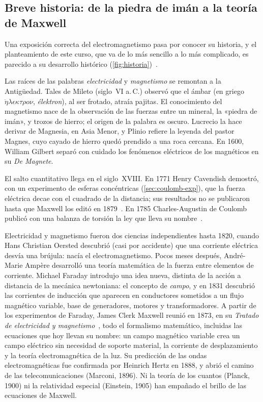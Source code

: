 \subsection{Breve historia: de la piedra de imán a la teoría de Maxwell}\label{sec:historia}
Una exposición correcta del electromagnetismo pasa por conocer su historia, y el
planteamiento de este curso, que va de lo más sencillo a lo más complicado, es parecido a su
desarrollo histórico (\cref{fig:historia})~\cite{WHITTAKER,HEILBRON}.



Las raíces de las palabras \emph{electricidad} y \emph{magnetismo} se remontan a la
Antigüedad. Tales de Mileto (siglo~VI a.\,C.) observó que el ámbar (en griego
$\ddot{\eta}\lambda\epsilon\kappa\tau\rho o\nu$, \emph{élektron}), al ser frotado, atraía
pajitas. El conocimiento del magnetismo nace de la observación de las fuerzas entre un mineral,
la «piedra de imán», y trozos de hierro; el origen de la palabra es oscuro. Lucrecio la
hace derivar de Magnesia, en Asia Menor, y Plinio refiere la leyenda del pastor Magnes, cuyo
cayado de hierro quedó prendido a una roca cercana. En 1600, William Gilbert separó con
cuidado los fenómenos eléctricos de los magnéticos en su \emph{De Magnete}.

El salto cuantitativo llega en el siglo~XVIII. En 1771 Henry Cavendish demostró, con un
experimento de esferas concéntricas (\cref{sec:coulomb-exp}), que la fuerza eléctrica
decae con el cuadrado de la distancia; sus resultados no se publicaron hasta que
Maxwell los editó en 1879~\cite{CAVENDISH-ELEC}. En 1785 Charles-Augustin de
Coulomb publicó con una balanza de torsión la ley que lleva su nombre~\cite{COULOMB}.

Electricidad y magnetismo fueron dos ciencias independientes hasta 1820, cuando Hans Christian
Oersted descubrió (casi por accidente) que una corriente eléctrica desvía una brújula: nacía el
electromagnetismo. Pocos meses después, André-Marie Ampère desarrolló una teoría matemática de
la fuerza entre elementos de corriente. Michael Faraday introdujo una idea nueva, distinta de
la acción a distancia de la mecánica newtoniana: el concepto de \emph{campo}, y en 1831
descubrió las corrientes de inducción que aparecen en conductores sometidos a un flujo magnético
variable, base de generadores, motores y transformadores. A partir de los experimentos de
Faraday, James Clerk Maxwell reunió en 1873, en su \emph{Tratado de electricidad y
magnetismo}~\cite{MAXWELL}, todo el formalismo matemático, incluidas las ecuaciones que hoy
llevan su nombre: un campo magnético variable crea un campo eléctrico sin necesidad de soporte
material, la corriente de desplazamiento y la teoría electromagnética de la luz. Su predicción de
las ondas electromagnéticas fue confirmada por Heinrich Hertz en 1888, y abrió el camino de las
telecomunicaciones (Marconi, 1896). Ni la teoría de los cuantos (Planck, 1900) ni la relatividad
especial (Einstein, 1905) han empañado el brillo de las ecuaciones de Maxwell.


